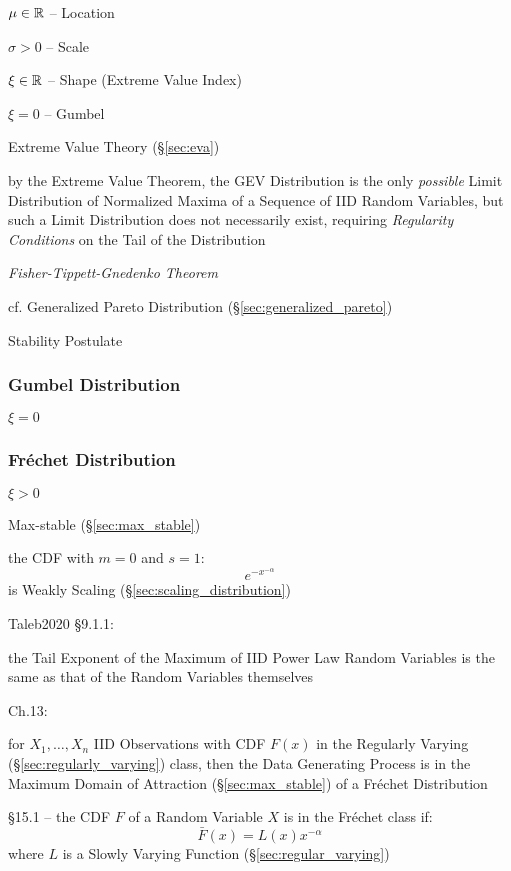 $\mu \in \mathbb{R}$ -- Location

$\sigma > 0$ -- Scale

$\xi \in \mathbb{R}$ -- Shape (Extreme Value Index)

$\xi = 0$ -- Gumbel

Extreme Value Theory (\S\ref{sec:eva})

by the Extreme Value Theorem, the GEV Distribution is the only \emph{possible}
Limit Distribution of Normalized Maxima of a Sequence of IID Random Variables,
but such a Limit Distribution does not necessarily exist, requiring
\emph{Regularity Conditions} on the Tail of the Distribution

\emph{Fisher-Tippett-Gnedenko Theorem}

cf. Generalized Pareto Distribution (\S\ref{sec:generalized_pareto})

Stability Postulate



\subsubsection{Gumbel Distribution}\label{sec:gumbel_distribution}

$\xi = 0$



\subsubsection{Fr\'echet Distribution}\label{sec:frechet_distribution}

$\xi > 0$

Max-stable (\S\ref{sec:max_stable})

the CDF with $m = 0$ and $s = 1$:
\[
  e^{-x^{-\alpha}}
\]
is Weakly Scaling (\S\ref{sec:scaling_distribution})

Taleb2020 \S 9.1.1:

the Tail Exponent of the Maximum of IID Power Law Random Variables is the same
as that of the Random Variables themselves

Ch.13:

for $X_1, \ldots, X_n$ IID Observations with CDF $F(x)$ in the Regularly Varying
(\S\ref{sec:regularly_varying}) class, then the Data Generating Process is in
the Maximum Domain of Attraction (\S\ref{sec:max_stable}) of a Fr\'echet
Distribution

\S 15.1 -- the CDF $F$ of a Random Variable $X$ is in the Fr\'echet class if:
\[
  \bar{F}(x) = L(x) x^{-\alpha}
\]
where $L$ is a Slowly Varying Function (\S\ref{sec:regular_varying})



